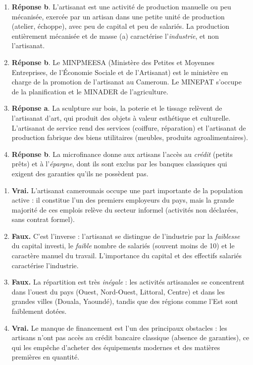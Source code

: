 \documentclass[11pt]{article}
\newcommand{\cle}[1]{{\popxbold\color{popdark}#1}}
\begin{document}
\begin{corrige}
\begin{enumerate}
\item \textbf{Réponse b}. L'artisanat est une activité de production \cle{manuelle ou peu mécanisée}, exercée par un artisan dans une petite unité de production (atelier, échoppe), avec peu de capital et peu de salariés. La production entièrement mécanisée et de masse (a) caractérise l'\emph{industrie}, et non l'artisanat.
\item \textbf{Réponse b}. Le \cle{MINPMEESA} (Ministère des Petites et Moyennes Entreprises, de l'Économie Sociale et de l'Artisanat) est le ministère en charge de la promotion de l'artisanat au Cameroun. Le MINEPAT s'occupe de la planification et le MINADER de l'agriculture.
\item \textbf{Réponse a}. La sculpture sur bois, la poterie et le tissage relèvent de l'\cle{artisanat d'art}, qui produit des objets à valeur esthétique et culturelle. L'artisanat de service rend des services (coiffure, réparation) et l'artisanat de production fabrique des biens utilitaires (meubles, produits agroalimentaires).
\item \textbf{Réponse b}. La \cle{microfinance} donne aux artisans l'accès au \emph{crédit} (petits prêts) et à l'\emph{épargne}, dont ils sont exclus par les banques classiques qui exigent des garanties qu'ils ne possèdent pas.
\end{enumerate}
\end{corrige}

\begin{corrige}
\begin{enumerate}
\item \textbf{Vrai.} L'artisanat camerounais occupe une part importante de la population active : il constitue l'un des premiers employeurs du pays, mais la grande majorité de ces emplois relève du \cle{secteur informel} (activités non déclarées, sans contrat formel).
\item \textbf{Faux.} C'est l'inverse : l'artisanat se distingue de l'industrie par la \emph{faiblesse} du capital investi, le \emph{faible} nombre de salariés (souvent moins de 10) et le caractère manuel du travail. L'importance du capital et des effectifs salariés caractérise l'industrie.
\item \textbf{Faux.} La répartition est très \emph{inégale} : les activités artisanales se concentrent dans l'ouest du pays (Ouest, Nord-Ouest, Littoral, Centre) et dans les grandes villes (Douala, Yaoundé), tandis que des régions comme l'Est sont faiblement dotées.
\item \textbf{Vrai.} Le manque de financement est l'un des principaux obstacles : les artisans n'ont pas accès au crédit bancaire classique (absence de garanties), ce qui les empêche d'acheter des équipements modernes et des matières premières en quantité.
\end{enumerate}
\end{corrige}
\end{document}
